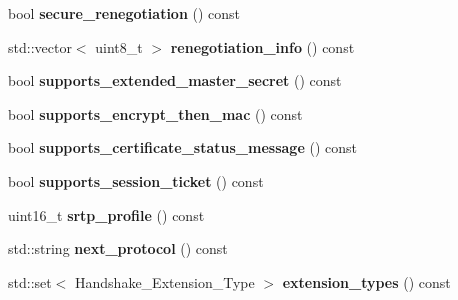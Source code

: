 \begin{DoxyCompactItemize}
bool {\bfseries secure\+\_\+renegotiation} () const
\item 
\mbox{\label{class_botan_1_1_t_l_s_1_1_server___hello_a909ae7ce21b588b168121fc7ae72830a}} 
std\+::vector$<$ uint8\+\_\+t $>$ {\bfseries renegotiation\+\_\+info} () const
\item 
\mbox{\label{class_botan_1_1_t_l_s_1_1_server___hello_aead7398f1d6b04667f2b07cc3c037e69}} 
bool {\bfseries supports\+\_\+extended\+\_\+master\+\_\+secret} () const
\item 
\mbox{\label{class_botan_1_1_t_l_s_1_1_server___hello_a6ce3a08dd5830fb045abe73e16a287c9}} 
bool {\bfseries supports\+\_\+encrypt\+\_\+then\+\_\+mac} () const
\item 
\mbox{\label{class_botan_1_1_t_l_s_1_1_server___hello_a839bae8a47c772d74d82c237bb5ae364}} 
bool {\bfseries supports\+\_\+certificate\+\_\+status\+\_\+message} () const
\item 
\mbox{\label{class_botan_1_1_t_l_s_1_1_server___hello_a8225b017d30ee0ba77d633d1c11a0ea4}} 
bool {\bfseries supports\+\_\+session\+\_\+ticket} () const
\item 
\mbox{\label{class_botan_1_1_t_l_s_1_1_server___hello_a46f04ecb1aad28bfe45d0ba2b177ad0d}} 
uint16\+\_\+t {\bfseries srtp\+\_\+profile} () const
\item 
\mbox{\label{class_botan_1_1_t_l_s_1_1_server___hello_a0d4f16bda622b1d96f8d5c601df681fd}} 
std\+::string {\bfseries next\+\_\+protocol} () const
\item 
\mbox{\label{class_botan_1_1_t_l_s_1_1_server___hello_a2807fa56d95fe67bd7934f8f22fa57aa}} 
std\+::set$<$ Handshake\+\_\+\+Extension\+\_\+\+Type $>$ {\bfseries extension\+\_\+types} () const
\item 
\mbox{\label{class_botan_1_1_t_l_s_1_1_server___hello_a2c86f968d47b2d3d646d0f9194b7417f}} 

\end{DoxyCompactItemize}
